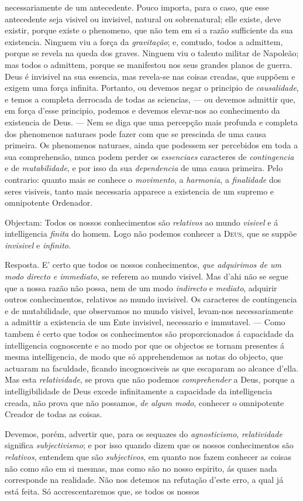 necessariamente de um antecedente. Pouco importa, para o caso, que esse antecedente seja visivel ou invisivel, natural ou sobrenatural; elle existe, deve existir, porque existe o phenomeno, que não tem em si a razão sufficiente da sua existencia. Ninguem viu a força da \emph{gravitação}; e, comtudo, todos a admittem, porque se revela na queda dos graves. Ninguem viu o talento militar de Napoleão; mas todos o admittem, porque se manifestou nos seus grandes planos de guerra. Deus é invisivel na sua essencia, mas revela-se nas coisas creadas, que suppõem e exigem uma força infinita. Portanto, ou devemos negar o principio de \emph{causalidade}, e temos a completa derrocada de todas as sciencias, --- ou devemos admittir que, em força d'esse principio, podemos e devemos elevar-nos ao conhecimento da existencia de Deus. --- Nem se diga que uma percepção mais profunda e completa dos phenomenos naturaes pode fazer com que se prescinda de uma causa primeira. Os phenomenos naturaes, ainda que podessem ser percebidos em toda a sua comprehensão, nunca podem perder os \emph{essenciaes} caracteres de \emph{contingencia} e de \emph{mutabilidade}, e por isso da sua \emph{dependencia} de uma causa primeira. Pelo contrario: quanto mais se conhece o \emph{movimento}, a \emph{harmonia}, a \emph{finalidade} dos seres visiveis, tanto mais necessaria apparece a existencia de um supremo e omnipotente Ordenador.\par Objectam: Todos os nossos conhecimentos são \emph{relativos} ao mundo \emph{visivel} e á intelligencia \emph{finita} do homem. Logo não podemos conhecer a \textsc{Deus}, que se suppõe \emph{invisivel} e \emph{infinito}.\par Resposta. E' certo que todos os nossos conhecimentos, \emph{que adquirimos de um modo directo e immediato}, se referem ao mundo visivel. Mas d'ahi não se segue que a nossa razão não possa, nem de um modo \emph{indirecto} e \emph{mediato}, adquirir outros conhecimentos, relativos ao mundo invisivel. Os caracteres de contingencia e de mutabilidade, que observamos no mundo visivel, levam-nos necessariamente a admittir a existencia de um Ente invisivel, necessario e immutavel. --- Como tambem é certo que todos os conhecimentos são proporcionados á capacidade da intelligencia cognoscente e ao modo por que os objectos se tornam presentes á mesma intelligencia, de modo que só apprehendemos as notas do objecto, que actuaram na faculdade, ficando incognosciveis as que escaparam ao alcance d'ella. Mas esta \emph{relatividade}, se prova que não podemos \emph{comprehender} a Deus, porque a intelligibilidade de Deus excede infinitamente a capacidade da intelligencia creada, não prova que não possamos, \emph{de algum modo}, conhecer o omnipotente Creador de todas as coisas.\par Devemos, porém, advertir que, para os sequazes do \emph{agnosticismo}, \emph{relatividade} significa \emph{subjectivismo}; e por isso quando dizem que os nossos conhecimentos são \emph{relativos}, entendem que são \emph{subjectivos}, em quanto nos fazem conhecer as coisas não como são em si mesmas, mas como são no nosso espirito, ás quaes nada corresponde na realidade. Não nos detemos na refutação d'este erro, a qual já está feita. Só accrescentaremos que, se todos os nossos 